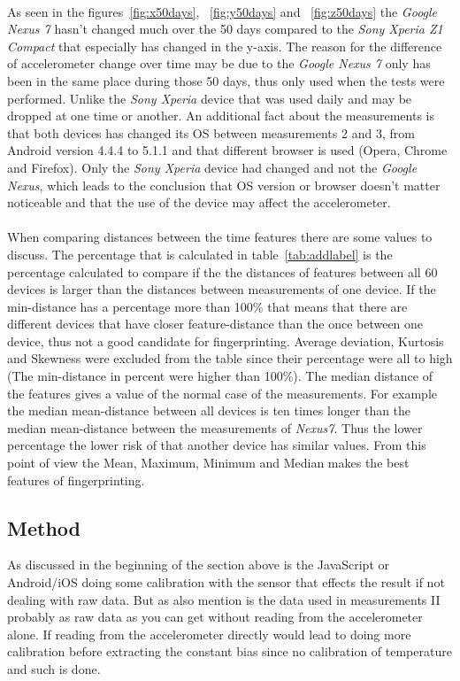 \\
As seen in the figures~\ref{fig:x50days}, ~\ref{fig:y50days} and ~\ref{fig:z50days} the \textit{Google Nexus 7} hasn't changed much over the 50 days compared to the \textit{Sony Xperia Z1 Compact} that especially has changed in the y-axis. The reason for the difference of accelerometer change over time may be due to the \textit{Google Nexus 7} only has been in the same place during those 50 days, thus only used when the tests were performed. Unlike the \textit{Sony Xperia} device that was used daily and may be dropped at one time or another. An additional fact about the measurements is that both devices has changed its OS between measurements 2 and 3, from Android version 4.4.4 to 5.1.1 and that different browser is used (Opera, Chrome and Firefox). Only the \textit{Sony Xperia} device had changed and not the \textit{Google Nexus}, which leads to the conclusion that OS version or browser doesn't matter noticeable and that the use of the device may affect the accelerometer.\\
\\
When comparing distances between the time features there are some values to discuss. The percentage that is calculated in table~\ref{tab:addlabel} is the percentage calculated to compare if the the distances of features between all 60 devices is larger than the distances between measurements of one device. If the min-distance has a percentage more than 100\% that means that there are different devices that have closer feature-distance than the once between one device, thus not a good candidate for fingerprinting. Average deviation, Kurtosis and Skewness were excluded from the table since their percentage were all to high (The min-distance in percent were higher than 100\%). The median distance of the features gives a value of the normal case of the measurements. For example the median mean-distance between all devices is ten times longer than the median mean-distance between the measurements of \textit{Nexus7}. Thus the lower percentage the lower risk of that another device has similar values. From this point of view the Mean, Maximum, Minimum and Median makes the best features of fingerprinting.

\subsection{Method}
As discussed in the beginning of the section above is the JavaScript or Android/iOS doing some calibration with the sensor that effects the result if not dealing with raw data. But as also mention is the data used in measurements II probably as raw data as you can get without reading from the accelerometer alone. If reading from the accelerometer directly would lead to doing more calibration before extracting the constant bias since no calibration of temperature and such is done.

